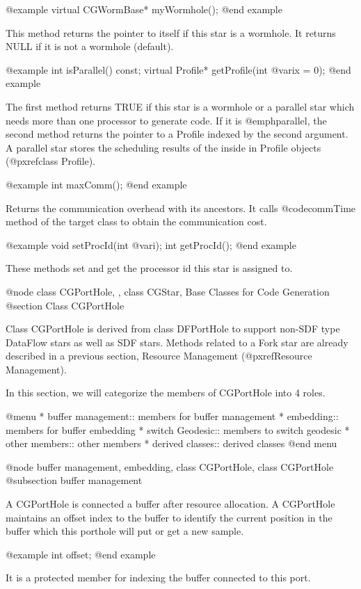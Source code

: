 @example
virtual CGWormBase* myWormhole();
@end example

This method returns the pointer to itself if this star is a wormhole. 
It returns NULL if it is not a wormhole (default).

@example
int isParallel() const;
virtual Profile* getProfile(int @var{ix} = 0);
@end example

The first method returns TRUE if this star is a wormhole or a parallel 
star which needs more than one processor to generate code. If it is
@emph{parallel}, the second method returns the pointer to a Profile
indexed by the second argument. A parallel star stores the scheduling
results of the inside in Profile objects (@pxref{class Profile}).

@example
int maxComm();
@end example

Returns the communication overhead with its ancestors. It calls
@code{commTime} method of the target class to obtain the communication
cost.

@example
void setProcId(int @var{i});
int getProcId();
@end example

These methods set and get the processor id this star is assigned to.

@node class CGPortHole, , class CGStar, Base Classes for Code Generation
@section Class CGPortHole

Class CGPortHole is derived from class DFPortHole to support non-SDF type
DataFlow stars as well as SDF stars. Methods related to a Fork star
are already described in a previous section, Resource Management
(@pxref{Resource Management}).

In this section, we will categorize the members of CGPortHole into 4
roles.

@menu
* buffer management::			members for buffer management
* embedding::				members for buffer embedding
* switch Geodesic::			members to switch geodesic
* other members::			other members
* derived classes::			derived classes
@end menu

@node buffer management, embedding, class CGPortHole, class CGPortHole
@subsection buffer management

A CGPortHole is connected a buffer after resource allocation. A CGPortHole
maintains an offset index to the buffer to identify the current position
in the buffer which this porthole will put or get a new sample.

@example
int offset;
@end example

It is a protected member for indexing the buffer connected to this port.

